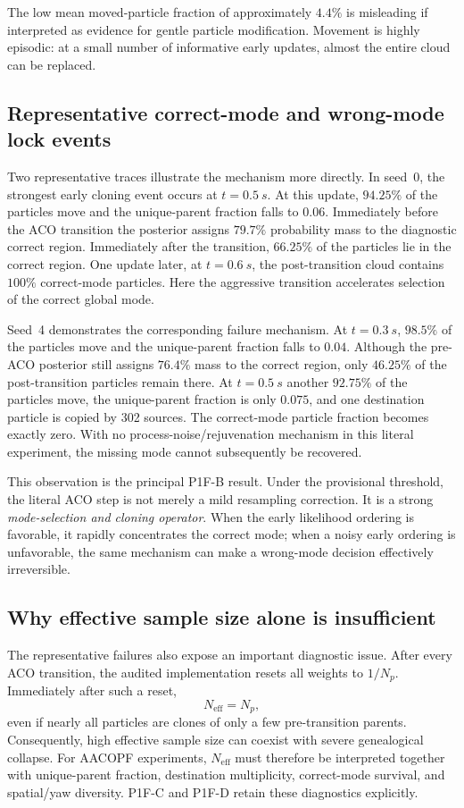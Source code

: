 The low mean moved-particle fraction of approximately $4.4\%$ is misleading if interpreted as evidence for gentle particle modification. Movement is highly episodic: at a small number of informative early updates, almost the entire cloud can be replaced.

\subsection{Representative correct-mode and wrong-mode lock events}
Two representative traces illustrate the mechanism more directly. In seed~0, the strongest early cloning event occurs at $t=\SI{0.5}{s}$. At this update, $94.25\%$ of the particles move and the unique-parent fraction falls to $0.06$. Immediately before the ACO transition the posterior assigns $79.7\%$ probability mass to the diagnostic correct region. Immediately after the transition, $66.25\%$ of the particles lie in the correct region. One update later, at $t=\SI{0.6}{s}$, the post-transition cloud contains $100\%$ correct-mode particles. Here the aggressive transition accelerates selection of the correct global mode.

Seed~4 demonstrates the corresponding failure mechanism. At $t=\SI{0.3}{s}$, $98.5\%$ of the particles move and the unique-parent fraction falls to $0.04$. Although the pre-ACO posterior still assigns $76.4\%$ mass to the correct region, only $46.25\%$ of the post-transition particles remain there. At $t=\SI{0.5}{s}$ another $92.75\%$ of the particles move, the unique-parent fraction is only $0.075$, and one destination particle is copied by 302 sources. The correct-mode particle fraction becomes exactly zero. With no process-noise/rejuvenation mechanism in this literal experiment, the missing mode cannot subsequently be recovered.

This observation is the principal P1F-B result. Under the provisional threshold, the literal ACO step is not merely a mild resampling correction. It is a strong \emph{mode-selection and cloning operator}. When the early likelihood ordering is favorable, it rapidly concentrates the correct mode; when a noisy early ordering is unfavorable, the same mechanism can make a wrong-mode decision effectively irreversible.

\subsection{Why effective sample size alone is insufficient}
The representative failures also expose an important diagnostic issue. After every ACO transition, the audited implementation resets all weights to $1/N_p$. Immediately after such a reset,
\begin{equation}
    N_{\mathrm{eff}}=N_p,
\end{equation}
even if nearly all particles are clones of only a few pre-transition parents. Consequently, high effective sample size can coexist with severe genealogical collapse. For AACOPF experiments, $N_{\mathrm{eff}}$ must therefore be interpreted together with unique-parent fraction, destination multiplicity, correct-mode survival, and spatial/yaw diversity. P1F-C and P1F-D retain these diagnostics explicitly.

